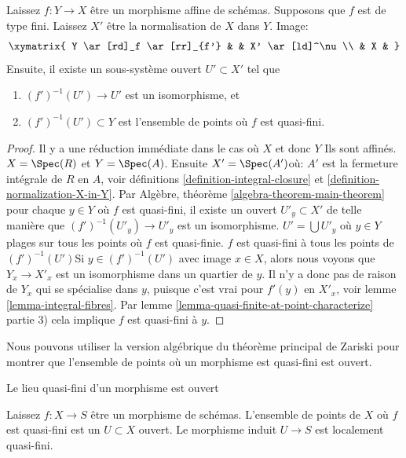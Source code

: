\begin{theorem}
\label{theorem-main-theorem}
Laissez $f : Y \to X$ être un morphisme affine de schémas. Supposons que $f$ est de type fini. Laissez $X'$ être la normalisation de $X$ dans $Y$. Image: $$
\xymatrix{
Y \ar[rd]_f \ar[rr]_{f'} & & X' \ar[ld]^\nu \\
& X &
}
$$ Ensuite, il existe un sous-système ouvert $U' \subset X'$ tel que
\begin{enumerate}
\item $(f')^{-1}(U') \to U'$ est un isomorphisme, et
\item $(f')^{-1}(U') \subset Y$ est l'ensemble de points où $f$ est quasi-fini.
\end{enumerate}

\end{theorem}

\begin{proof}

Il y a une réduction immédiate dans le cas où $X$ et donc $Y$
Ils sont affinés. $X = \Spec(R)$ et $Y = \Spec(A)$. Ensuite $X' = \Spec(A')$où: $A'$ est la fermeture intégrale de
$R$ en $A$, voir définitions \ref{definition-integral-closure}
et \ref{definition-normalization-X-in-Y}. Par Algèbre, théorème \ref{algebra-theorem-main-theorem}
pour chaque $y \in Y$ où $f$ est quasi-fini, il existe un ouvert $U'_y \subset X'$ de telle manière que $(f')^{-1}(U'_y) \to U'_y$
est un isomorphisme. $U' = \bigcup U'_y$ où $y \in Y$ plages sur tous les points où $f$ est quasi-finie.
$f$ est quasi-fini à tous les points de $(f')^{-1}(U')$Si $y \in (f')^{-1}(U')$ avec image $x \in X$, alors nous voyons que
$Y_x \to X'_x$ est un isomorphisme dans un quartier de $y$. Il n'y a donc pas de raison de $Y_x$ qui se spécialise dans $y$, puisque c'est vrai pour $f'(y)$ en $X'_x$, voir lemme \ref{lemma-integral-fibres}. Par lemme \ref{lemma-quasi-finite-at-point-characterize} partie 3) cela implique $f$ est quasi-fini à $y$.

\end{proof}

\noindent
Nous pouvons utiliser la version algébrique du théorème principal de Zariski pour montrer que l'ensemble de points où un morphisme est quasi-fini est ouvert.

\begin{lemma}

\label{lemma-quasi-finite-points-open}

\begin{slogan}
Le lieu quasi-fini d'un morphisme est ouvert
\end{slogan}
Laissez $f : X \to S$ être un morphisme de schémas. L'ensemble de points de $X$ où $f$ est quasi-fini est un $U \subset X$ ouvert. Le morphisme induit $U \to S$ est localement quasi-fini.
\end{lemma}

